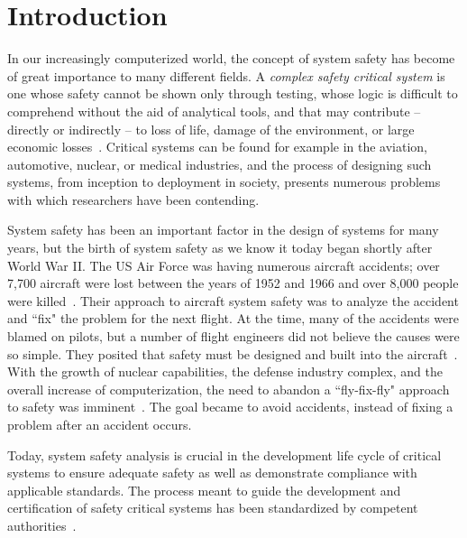 \chapter{Introduction}
\label{chap:intro}
In our increasingly computerized world, the concept of system safety has become of great importance to many different fields. A \emph{complex safety critical system} is one whose safety cannot be shown only through testing, whose logic is difficult to comprehend without the aid of analytical tools, and that may contribute -- directly or indirectly -- to loss of life, damage of the environment, or large economic losses~\cite{SAE}. Critical systems can be found for example in the aviation, automotive, nuclear, or medical industries, and the process of designing such systems, from inception to deployment in society, presents numerous problems with which researchers have been contending. 

System safety has been an important factor in the design of systems for many years, but the birth of system safety as we know it today began shortly after World War II. The US Air Force was having numerous aircraft accidents; over 7,700 aircraft were lost between the years of 1952 and 1966 and over 8,000 people were killed~\cite{hammer}. Their approach to aircraft system safety was to analyze the accident and ``fix" the problem for the next flight. At the time, many of the accidents were blamed on pilots, but a number of flight engineers did not believe the causes were so simple. They posited that safety must be designed and built into the aircraft~\cite{levesonWhitePaper}. With the growth of nuclear capabilities, the defense industry complex, and the overall increase of computerization, the need to abandon a ``fly-fix-fly" approach to safety was imminent~\cite{miller1954applying, levesonWhitePaper, hammer}. The goal became to avoid accidents, instead of fixing a problem after an accident occurs.

Today, system safety analysis is crucial in the development life cycle of critical systems to ensure adequate safety as well as demonstrate compliance with applicable standards. The process meant to guide the development and certification of safety critical systems has been standardized by competent authorities~\cite{SAE,SAE:ARP4761,SAE:ARP4754A}.

